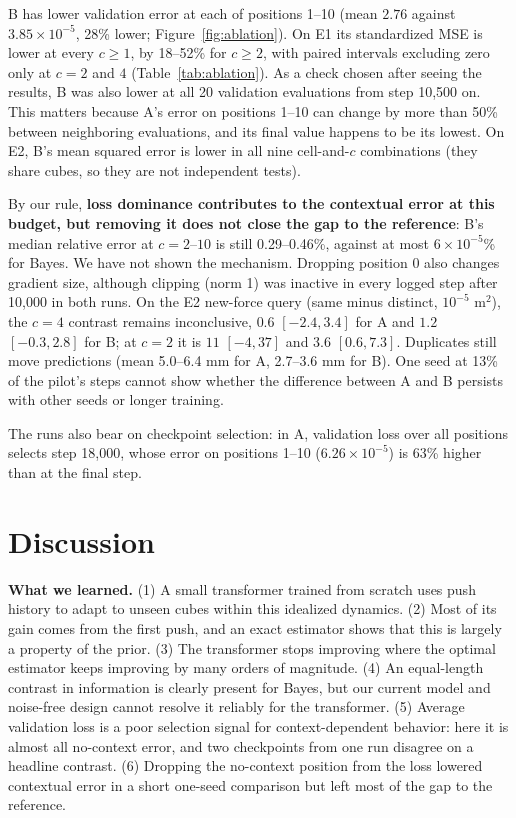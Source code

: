 \documentclass{article}
\begin{document}
B has lower validation error at each of positions 1--10 (mean $2.76$ against $3.85\times10^{-5}$, 28\% lower; Figure~\ref{fig:ablation}). On E1 its standardized MSE is lower at every $c\ge1$, by 18--52\% for $c\ge2$, with paired intervals excluding zero only at $c=2$ and $4$ (Table~\ref{tab:ablation}). As a check chosen after seeing the results, B was also lower at all 20 validation evaluations from step 10,500 on. This matters because A's error on positions 1--10 can change by more than 50\% between neighboring evaluations, and its final value happens to be its lowest. On E2, B's mean squared error is lower in all nine cell-and-$c$ combinations (they share cubes, so they are not independent tests).

By our rule, \textbf{loss dominance contributes to the contextual error at this budget, but removing it does not close the gap to the reference}: B's median relative error at $c=2$--$10$ is still 0.29--0.46\%, against at most $6\times10^{-5}$\% for Bayes. We have not shown the mechanism. Dropping position 0 also changes gradient size, although clipping (norm 1) was inactive in every logged step after 10,000 in both runs. On the E2 new-force query (same minus distinct, $10^{-5}$ m$^2$), the $c=4$ contrast remains inconclusive, $0.6$ $[-2.4, 3.4]$ for A and $1.2$ $[-0.3, 2.8]$ for B; at $c=2$ it is $11$ $[-4, 37]$ and $3.6$ $[0.6, 7.3]$. Duplicates still move predictions (mean 5.0--6.4 mm for A, 2.7--3.6 mm for B). One seed at 13\% of the pilot's steps cannot show whether the difference between A and B persists with other seeds or longer training.

The runs also bear on checkpoint selection: in A, validation loss over all positions selects step 18,000, whose error on positions 1--10 ($6.26\times10^{-5}$) is 63\% higher than at the final step.

\section{Discussion}
\textbf{What we learned.} (1) A small transformer trained from scratch uses push history to adapt to unseen cubes within this idealized dynamics. (2) Most of its gain comes from the first push, and an exact estimator shows that this is largely a property of the prior. (3) The transformer stops improving where the optimal estimator keeps improving by many orders of magnitude. (4) An equal-length contrast in information is clearly present for Bayes, but our current model and noise-free design cannot resolve it reliably for the transformer. (5) Average validation loss is a poor selection signal for context-dependent behavior: here it is almost all no-context error, and two checkpoints from one run disagree on a headline contrast. (6) Dropping the no-context position from the loss lowered contextual error in a short one-seed comparison but left most of the gap to the reference.
\end{document}
